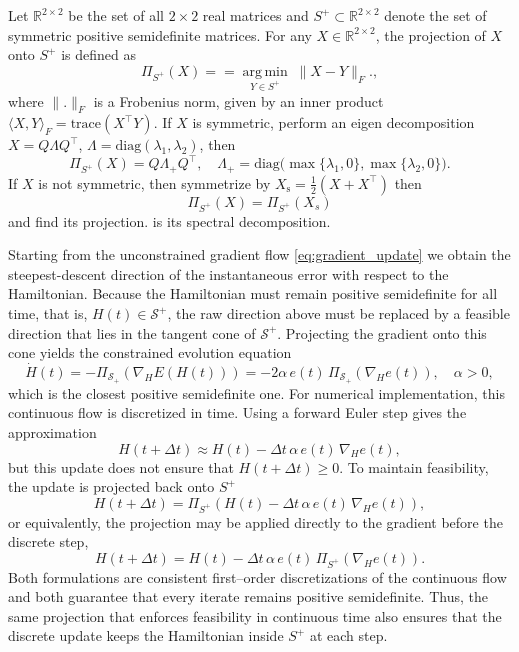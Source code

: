 \documentclass[reqno]{amsart}
\numberwithin{equation}{section}
\begin{document}
Let $ \mathbb{R}^{2\times 2}$ be the set of all $2\times 2$ real matrices and  $S^+ \subset \mathbb{R}^{2\times 2}$ denote the set of symmetric positive semidefinite matrices. For any $X\in \mathbb{R}^{2\times 2}$, the projection of 
$X$ onto $ S^+$ is defined as
\begin{equation} \Pi_{S^+}(X)=  
= \underset{Y\in S^+}{\operatorname*{arg\,min}}\;\|X - Y\|_F.
\label{eq:minprob}
,\end{equation}  where $ \| . \|_F$ is a Frobenius norm, given by an inner product   $\langle X,Y\rangle_F = \mathrm{trace}(X^\top Y)$.
If $X$ is symmetric, perform an eigen decomposition $ X = Q\Lambda Q^\top $, $ \Lambda = \mathrm{diag}(\lambda_1, \lambda_2)$, then \[ \Pi_{S^+}(X)= Q\Lambda_+ Q^\top, \quad \Lambda_+ = \mathrm{ diag }\!\big(\max\{\lambda_1,0\},  \max\{\lambda_2,0\}\big). \]
 If $X$ is not symmetric, then symmetrize by
$ X_{\mathrm{s}}=\tfrac12(X+X^\top)$ then \[\Pi_{S^+}(X) =\Pi_{S^+}(X_s) \]   and find its projection. 
is its spectral decomposition.
 
Starting from the unconstrained gradient flow \eqref{eq:gradient_update} we obtain the steepest-descent direction of the instantaneous error with respect to the Hamiltonian. Because the Hamiltonian must remain positive semidefinite for all time, that is, $H(t)\in \mathcal S^{+}$, the raw direction above must be replaced by a feasible direction that lies in the tangent cone of $\mathcal S^{+}$. Projecting the gradient onto this cone yields the constrained evolution equation
\begin{equation}\label{ceq}
\dot H(t) = - \Pi_{\mathcal{S}_+}(\nabla_H E(H(t))) = -2 \alpha\, e(t)\, \Pi_{\mathcal{S}_+}(\nabla_H e(t)), \quad \alpha>0,
\end{equation}
which is the closest positive semidefinite one. For numerical implementation, this continuous flow is discretized in time. Using a forward Euler step gives the approximation
\begin{equation}
H(t+\Delta t)
\approx
H(t) - \Delta t\,\alpha\, e(t)\,\nabla_H e(t),
\end{equation}
but this update does not ensure that $H(t+\Delta t)\geq 0$. To maintain feasibility, the update is projected back onto $ S^+$
\begin{equation}
H(t+\Delta t)
=
\Pi_{S^+}\!\left(
H(t) - \Delta t\,\alpha\, e(t)\,\nabla_H e(t)
\right),
\end{equation}
or equivalently, the projection may be applied directly to the gradient before the discrete step,
\begin{equation}
H(t+\Delta t)
=
H(t) - \Delta t\,\alpha\, e(t)\,
\Pi_{S^+}\!\left(\nabla_H e(t)\right).
\end{equation}
Both formulations are consistent first--order discretizations of the continuous flow and both guarantee that every iterate remains positive semidefinite. Thus, the same projection that enforces feasibility in continuous time also ensures that the discrete update keeps the Hamiltonian inside $S^+$ at each step.
\end{document}
